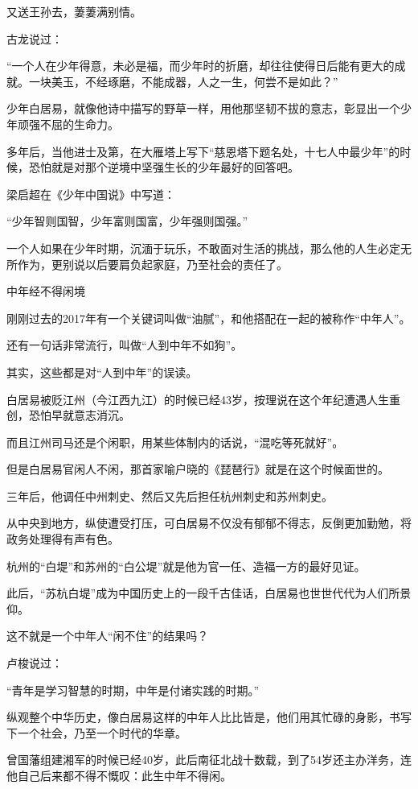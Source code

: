 \documentclass[11pt]{ctexart}
\begin{document}
{{{{又送王孙去，萋萋满别情。

古龙说过：

“一个人在少年得意，未必是福，而少年时的折磨，却往往使得日后能有更大的成就。一块美玉，不经琢磨，不能成器，人之一生，何尝不是如此？”

少年白居易，就像他诗中描写的野草一样，用他那坚韧不拔的意志，彰显出一个少年顽强不屈的生命力。

多年后，当他进士及第，在大雁塔上写下“慈恩塔下题名处，十七人中最少年”的时候，恐怕就是对那个逆境中坚强生长的少年最好的回答吧。

梁启超在《少年中国说》中写道：

“少年智则国智，少年富则国富，少年强则国强。”

一个人如果在少年时期，沉湎于玩乐，不敢面对生活的挑战，那么他的人生必定无所作为，更别说以后要肩负起家庭，乃至社会的责任了。





中年经不得闲境

刚刚过去的2017年有一个关键词叫做“油腻”，和他搭配在一起的被称作“中年人”。

还有一句话非常流行，叫做“人到中年不如狗”。

其实，这些都是对“人到中年”的误读。

白居易被贬江州（今江西九江）的时候已经43岁，按理说在这个年纪遭遇人生重创，恐怕早就意志消沉。

而且江州司马还是个闲职，用某些体制内的话说，“混吃等死就好”。

但是白居易官闲人不闲，那首家喻户晓的《琵琶行》就是在这个时候面世的。

三年后，他调任中州刺史、然后又先后担任杭州刺史和苏州刺史。

从中央到地方，纵使遭受打压，可白居易不仅没有郁郁不得志，反倒更加勤勉，将政务处理得有声有色。

杭州的“白堤”和苏州的“白公堤”就是他为官一任、造福一方的最好见证。

此后，“苏杭白堤”成为中国历史上的一段千古佳话，白居易也世世代代为人们所景仰。

这不就是一个中年人“闲不住”的结果吗？

卢梭说过：

“青年是学习智慧的时期，中年是付诸实践的时期。”

纵观整个中华历史，像白居易这样的中年人比比皆是，他们用其忙碌的身影，书写下一个社会，乃至一个时代的华章。

曾国藩组建湘军的时候已经40岁，此后南征北战十数载，到了54岁还主办洋务，连他自己后来都不得不慨叹：此生中年不得闲。

}}}}
\end{document}
